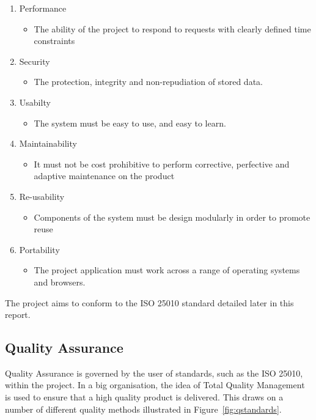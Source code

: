 \begin{enumerate}
\item Performance
\begin{itemize}
\item The ability of the project to respond to requests with clearly defined time constraints
\end{itemize}
\item Security
\begin{itemize}
\item The protection, integrity and non-repudiation of stored data.
\end{itemize}
\item Usabilty
\begin{itemize}
\item The system must be easy to use, and easy to learn.
\end{itemize}
\item Maintainability
\begin{itemize}
\item It must not be cost prohibitive to perform corrective, perfective and adaptive maintenance on the product
\end{itemize}
\item Re-usability
\begin{itemize}
\item Components of the system must be design modularly in order to promote reuse
\end{itemize}
\item Portability
\begin{itemize}
\item The project application must work across a range of operating systems and browsers.
\end{itemize}
\end{enumerate}

The project aims to conform to the ISO 25010 standard detailed later in this report.

\subsection{Quality Assurance}

Quality Assurance is governed by the user of standards, such as the ISO 25010, within the project. In a big organisation, the idea of Total Quality Management is used to ensure that a high quality product is delivered. This draws on a number of different quality methods illustrated in Figure~\ref{fig:qstandards}.

